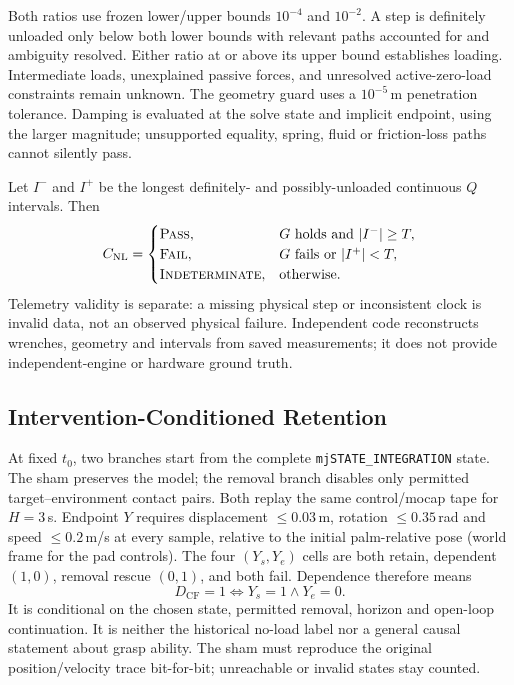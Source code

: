 \documentclass[conference,10pt,letterpaper]{IEEEtran}
\newcommand{\NL}{C_{\mathrm{NL}}}
\newcommand{\Pass}{\textsc{Pass}}
\newcommand{\Fail}{\textsc{Fail}}
\newcommand{\Unk}{\textsc{Indeterminate}}
\begin{document}
Both ratios use frozen lower/upper bounds $10^{-4}$ and $10^{-2}$.
A step is definitely unloaded only below both lower bounds with relevant
paths accounted for and ambiguity resolved. Either ratio at or above its
upper bound establishes loading. Intermediate loads, unexplained passive
forces, and unresolved active-zero-load constraints remain unknown.
The geometry guard uses a $10^{-5}$\,m penetration tolerance. Damping is
evaluated at the solve state and implicit endpoint, using the larger magnitude;
unsupported equality, spring, fluid or friction-loss paths cannot silently pass.

Let $I^-$ and $I^+$ be the longest definitely- and possibly-unloaded
continuous $Q$ intervals. Then
\begin{equation}
\NL=\begin{cases}
\Pass,&G\text{ holds and }|I^-|\ge T,\\
\Fail,&G\text{ fails or }|I^+|<T,\\
\Unk,&\text{otherwise.}
\end{cases}
\end{equation}
Telemetry validity is separate: a missing physical step or inconsistent clock
is invalid data, not an observed physical failure. Independent code
reconstructs wrenches, geometry and intervals from saved measurements; it
does not provide independent-engine or hardware ground truth.

\subsection{Intervention-Conditioned Retention}
At fixed $t_0$, two branches start from the complete
\texttt{mjSTATE\_INTEGRATION} state. The sham preserves the model; the removal
branch disables only permitted target--environment contact pairs. Both replay
the same control/mocap tape for $H=3$\,s. Endpoint $Y$ requires displacement
$\le0.03$\,m, rotation $\le0.35$\,rad and speed $\le0.2$\,m/s at every sample,
relative to the initial palm-relative pose (world frame for the pad controls).
The four $(Y_s,Y_e)$ cells are both retain, dependent $(1,0)$, removal rescue
$(0,1)$, and both fail. Dependence therefore means
\begin{equation}
D_{\mathrm{CF}}=1\iff Y_s=1\wedge Y_e=0.
\end{equation}
It is conditional on the chosen state, permitted removal, horizon and open-loop
continuation. It is neither the historical no-load label nor a general
causal statement about grasp ability. The sham must reproduce the original
position/velocity trace bit-for-bit; unreachable or invalid states stay counted.
\end{document}
